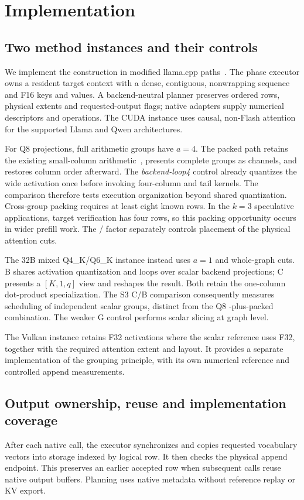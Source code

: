 \section{Implementation}
\label{sec:implementation}

\subsection{Two method instances and their controls}
We implement the construction in modified llama.cpp paths~\cite{records}. The phase executor owns a resident target context with a dense, contiguous, nonwrapping sequence and F16 keys and values. A backend-neutral planner preserves ordered rows, physical extents and requested-output flags; native adapters supply numerical descriptors and operations. The CUDA instance uses causal, non-Flash attention for the supported Llama and Qwen architectures.

For Q8 projections, full arithmetic groups have $a=4$. The packed path retains the existing small-column arithmetic~\cite{loop4code}, presents complete groups as channels, and restores column order afterward. The \emph{backend-loop4} control already quantizes the wide activation once before invoking four-column and tail kernels. The comparison therefore tests execution organization beyond shared quantization. Cross-group packing requires at least eight known rows. In the $k=3$ speculative applications, target verification has four rows, so this packing opportunity occurs in wider prefill work. The \Simple/\Local{} factor separately controls placement of the physical attention cuts.

The 32B mixed Q4\_K/Q6\_K instance instead uses $a=1$ and whole-graph cuts. B shares activation quantization and loops over scalar backend projections; C presents a $[K,1,q]$ view and reshapes the result. Both retain the one-column dot-product specialization. The S3 C/B comparison consequently measures scheduling of independent scalar groups, distinct from the Q8 \Local-plus-packed combination. The weaker G control performs scalar slicing at graph level.

The Vulkan instance retains F32 activations where the scalar reference uses F32, together with the required attention extent and layout. It provides a separate implementation of the grouping principle, with its own numerical reference and controlled append measurements.

\subsection{Output ownership, reuse and implementation coverage}
After each native call, the executor synchronizes and copies requested vocabulary vectors into storage indexed by logical row. It then checks the physical append endpoint. This preserves an earlier accepted row when subsequent calls reuse native output buffers. Planning uses native metadata without reference replay or KV export.

